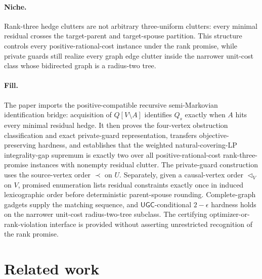 \documentclass{article}
\begin{document}
\paragraph{Niche.} Rank-three hedge clutters are not arbitrary three-uniform clutters: every minimal residual crosses the target-parent and target-spouse partition. This structure controls every positive-rational-cost instance under the rank promise, while private guards still realize every graph edge clutter inside the narrower unit-cost class whose bidirected graph is a radius-two tree.

\paragraph{Fill.} The paper imports the positive-compatible recursive semi-Markovian identification bridge: acquisition of \(Q[V\setminus A]\) identifies \(Q_s\) exactly when \(A\) hits every minimal residual hedge. It then proves the four-vertex obstruction classification and exact private-guard representation, transfers objective-preserving hardness, and establishes that the weighted natural-covering-LP integrality-gap supremum is exactly two over all positive-rational-cost rank-three-promise instances with nonempty residual clutter. The private-guard construction uses the source-vertex order \(\prec\) on \(U\). Separately, given a causal-vertex order \(\triangleleft_V\) on \(V\), promised enumeration lists residual constraints exactly once in induced lexicographic order before deterministic parent-spouse rounding. Complete-graph gadgets supply the matching sequence, and \(\mathsf{UGC}\)-conditional \(2-\epsilon\) hardness holds on the narrower unit-cost radius-two-tree subclass. The certifying optimizer-or-rank-violation interface is provided without asserting unrestricted recognition of the rank promise.

\section{Related work}
\end{document}
